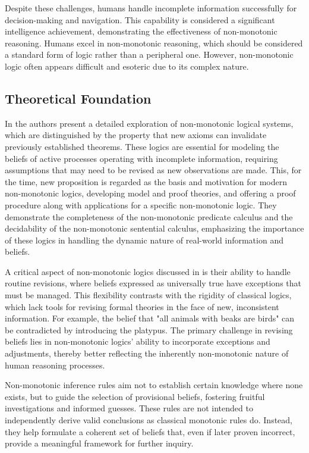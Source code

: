 Despite these challenges, humans handle incomplete information successfully for decision-making and navigation.
This capability is considered a significant intelligence achievement, demonstrating the effectiveness of non-monotonic reasoning.
Humans excel in non-monotonic reasoning, which should be considered a standard form of logic rather than a peripheral one.
However, non-monotonic logic often appears difficult and esoteric due to its complex nature.

\subsection{Theoretical Foundation}
In \cite{mcdermott_non-monotonic_1980} the authors present a detailed exploration of non-monotonic logical systems, which are distinguished by the property that new axioms can invalidate previously established theorems.
These logics are essential for modeling the beliefs of active processes operating with incomplete information, requiring assumptions that may need to be revised as new observations are made.
This, for the time, new proposition is regarded as the basis and motivation for modern non-monotonic logics, developing model and proof theories, and offering a proof procedure along with applications for a specific non-monotonic logic.
They demonstrate the completeness of the non-monotonic predicate calculus and the decidability of the non-monotonic sentential calculus, emphasizing the importance of these logics in handling the dynamic nature of real-world information and beliefs.

A critical aspect of non-monotonic logics discussed in \cite{mcdermott_non-monotonic_1980} is their ability to handle routine revisions, where beliefs expressed as universally true have exceptions that must be managed.
This flexibility contrasts with the rigidity of classical logics, which lack tools for revising formal theories in the face of new, inconsistent information.
For example, the belief that "all animals with beaks are birds" can be contradicted by introducing the platypus.
The primary challenge in revising beliefs lies in non-monotonic logics' ability to incorporate exceptions and adjustments, thereby better reflecting the inherently non-monotonic nature of human reasoning processes.

Non-monotonic inference rules aim not to establish certain knowledge where none exists, but to guide the selection of provisional beliefs, fostering fruitful investigations and informed guesses.
These rules are not intended to independently derive valid conclusions as classical monotonic rules do.
Instead, they help formulate a coherent set of beliefs that, even if later proven incorrect, provide a meaningful framework for further inquiry.

